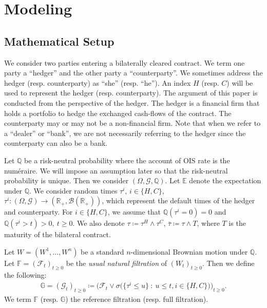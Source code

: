 \documentclass[a4paper, 11pt]{article}              %
\numberwithin{equation}{section}
\theoremstyle{plain}
\newcommand{\btau}{\bar{\tau}}
\newcommand{\1}{\mathds{1}}
\newcommand{\calF}{\mathcal{F}}
\newcommand{\calB}{\mathcal{B}}
\newcommand{\calG}{\mathcal{G}}
\newcommand{\dsE}{\mathbb{E}}
\newcommand{\dsF}{\mathbb{F}}
\newcommand{\dsQ}{\mathbb{Q}}
\newcommand{\dsR}{\mathbb{R}}
\newcommand{\dsG}{\mathbb{G}}
\theoremstyle{plain}
\theoremstyle{definition}
\theoremstyle{plain}
\begin{document}
\section{Modeling}\label{sec:modeling}

\subsection{Mathematical Setup}\label{sec:setup}
We consider two parties entering a bilaterally cleared contract. We term one
party a ``hedger'' and the other party a ``counterparty''. We sometimes address
the hedger (resp. counterparty) as ``she'' (resp. ``he''). An index $H$
(resp. $C$) will be used to represent the hedger (resp. counterparty). The
argument of this paper is conducted from the perspective of the hedger. The
hedger is a financial firm that holds a portfolio to hedge the exchanged
cash-flows of the contract. The counterparty may or may not be a non-financial
firm.  Note that when we refer to  a ``dealer'' or ``bank'', we are not necessarily
referring to the hedger since the counterparty can also be a bank.

Let $\dsQ$ be a risk-neutral probability where the account of OIS rate is the
num\'eraire. We will impose an assumption later so that the risk-neutral
probability is unique. Then we consider $(\Omega, \calG, \dsQ)$.  Let $\dsE$ denote
the expectation under $\dsQ$. We consider random times $\tau^i$,
$i \in \{H, C\}$, $\tau^i \colon (\Omega, \calG) \to (\dsR_+, \calB(\dsR_+))$, which
represent the default times of the hedger and counterparty. For $i\in \{H, C\}$,
we assume that $ \dsQ(\tau^i=0) =0$ and
$\dsQ(\tau^i>t) > 0, ~ t \geq0$. We also denote
 $\tau \coloneqq  \tau^H \wedge \tau^C$, $\btau \coloneqq \tau \wedge T$,
where $T$ is the maturity of the bilateral contract.

Let $W=(W^1, \dots, W^n)$ be a standard $n$-dimensional Brownian motion under
$\dsQ$. Let $\dsF = (\calF_t)_{t \geq0}$ be the \textit{usual natural filtration} 
of $(W_t)_{t \geq0}$. Then we define the following:
\begin{align}
 \dsG = (\calG_t)_{t \geq0}
  \coloneqq \Big(\calF_t \vee \sigma\big(\{\tau^i \leq u\}
  ~\colon~ u \leq t, i \in \{H, C\} \big)\Big)_{t \geq0}.  \nonumber 
\end{align}
We term $\dsF$ (resp. $\dsG$) the reference filtration (resp. full filtration). 
\end{document}
